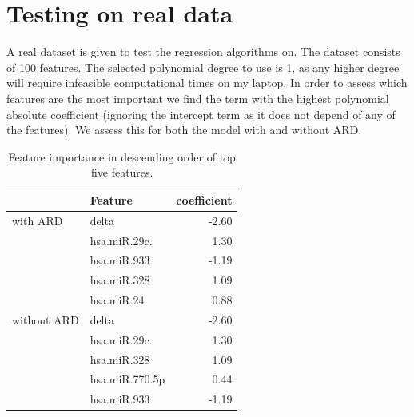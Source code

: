 \documentclass[12pt]{article}
\begin{document}
    \section{Testing on real data}
    A real dataset is given to test the regression algorithms on. The dataset consists of 100 features. The selected polynomial degree to use is 1, as any higher degree will require infeasible computational times on my laptop. In order to assess which features are the most important we find the term with the highest polynomial absolute coefficient (ignoring the intercept term as it does not depend of any of the features). We assess this for both the model with and without ARD. 
    \begin{table}[H]
        \centering
        \caption{Feature importance in descending order of top five features.}
        \begin{tabular}{llr}
            \toprule
                        & Feature            &  coefficient \\
            \midrule
            with ARD & delta &        -2.60 \\
            & hsa.miR.29c. &         1.30 \\
            & hsa.miR.933 &        -1.19 \\
            & hsa.miR.328 &         1.09 \\
            & hsa.miR.24 &         0.88 \\
            \midrule
            without ARD & delta &        -2.60 \\
                        & hsa.miR.29c. &         1.30 \\
                        & hsa.miR.328 &         1.09 \\
                        & hsa.miR.770.5p &         0.44 \\
                        & hsa.miR.933 &        -1.19 \\
            \bottomrule
        \end{tabular}
    \end{table} 
\end{document}
